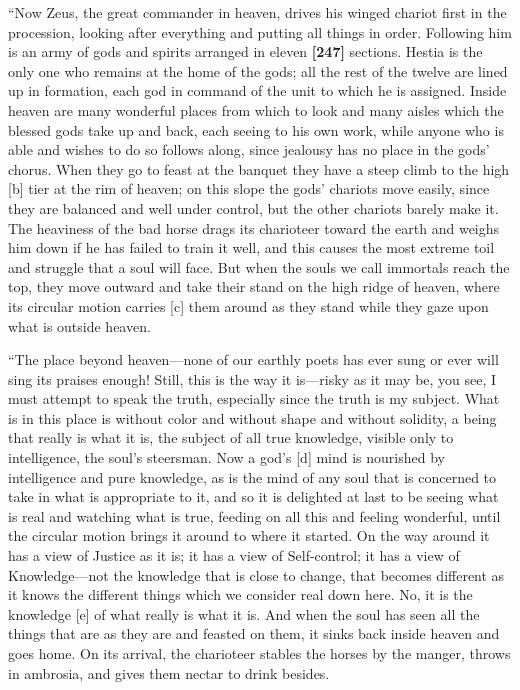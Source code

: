 “Now Zeus, the great commander in heaven, drives his winged chariot
first in the procession, looking after everything and putting all things
in order. Following him is an army of gods and spirits arranged in
eleven {\bf {[}247{]}} sections. Hestia is the only one who remains at
the home of the gods; all the rest of the twelve are lined up in
formation, each god in command of the unit to which he is assigned.
Inside heaven are many wonderful places from which to look and many
aisles which the blessed gods take up and back, each seeing to his own
work, while anyone who is able and wishes to do so follows along, since
jealousy has no place in the gods' chorus. When they go to feast at the
banquet they have a steep climb to the high {[}b{]} tier at the rim of
heaven; on this slope the gods' chariots move easily, since they are
balanced and well under control, but the other chariots barely make it.
The heaviness of the bad horse drags its charioteer toward the earth and
weighs him down if he has failed to train it well, and this causes the
most extreme toil and struggle that a soul will face. But when the souls
we call immortals reach the top, they move outward and take their stand
on the high ridge of heaven, where its circular motion carries {[}c{]}
them around as they stand while they gaze upon what is outside heaven.

“The place beyond heaven---none of our earthly poets has ever sung or
ever will sing its praises enough! Still, this is the way it is---risky
as it may be, you see, I must attempt to speak the truth, especially
since the truth is my subject. What is in this place is without color
and without shape and without solidity, a being that really is what it
is, the subject of all true knowledge, visible only to intelligence, the
soul's steersman. Now a god's {[}d{]} mind is nourished by intelligence
and pure knowledge, as is the mind of any soul that is concerned to take
in what is appropriate to it, and so it is delighted at last to be
seeing what is real and watching what is true, feeding on all this and
feeling wonderful, until the circular motion brings it around to where
it started. On the way around it has a view of Justice as it is; it has
a view of Self-control; it has a view of Knowledge---not the knowledge
that is close to change, that becomes different as it knows the
different things which we consider real down here. No, it is the
knowledge {[}e{]} of what really is what it is. And when the soul has
seen all the things that are as they are and feasted on them, it sinks
back inside heaven and goes home. On its arrival, the charioteer stables
the horses by the manger, throws in ambrosia, and gives them nectar to
drink besides.

